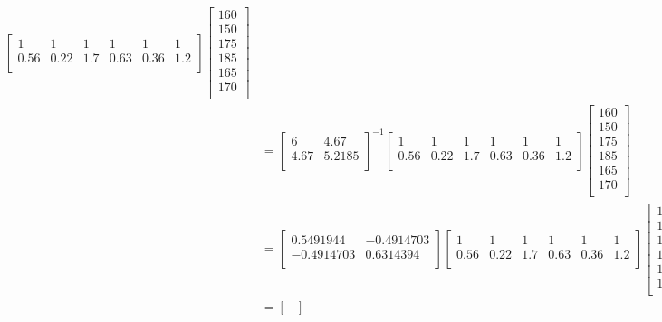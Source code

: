 \begin{enumerate}
\begin{align*}
\begin{bmatrix}
1 & 1 & 1 & 1 & 1 & 1 \\
0.56 & 0.22 & 1.7 & 0.63 & 0.36 &  1.2   \\
\end{bmatrix}
\begin{bmatrix}
160  \\
150  \\
175  \\
185  \\
165  \\
170  \\
\end{bmatrix} \\ &=
\begin{bmatrix}
6 & 4.67  \\
4.67 & 5.2185   \\
\end{bmatrix}^{-1}
\begin{bmatrix}
1 & 1 & 1 & 1 & 1 & 1 \\
0.56 & 0.22 & 1.7 & 0.63 & 0.36 &  1.2   \\
\end{bmatrix}
\begin{bmatrix}
160  \\
150  \\
175  \\
185  \\
165  \\
170  \\
\end{bmatrix} \\ &=
 \begin{bmatrix}
0.5491944 & -0.4914703  \\
-0.4914703  & 0.6314394   \\
\end{bmatrix}
\begin{bmatrix}
1 & 1 & 1 & 1 & 1 & 1 \\
0.56 & 0.22 & 1.7 & 0.63 & 0.36 &  1.2   \\
\end{bmatrix}
\begin{bmatrix}
160  \\
150  \\
175  \\
185  \\
165  \\
170  \\
\end{bmatrix} \\
&= \begin{bmatrix}

\end{bmatrix}
\end{align*}
\end{enumerate}
